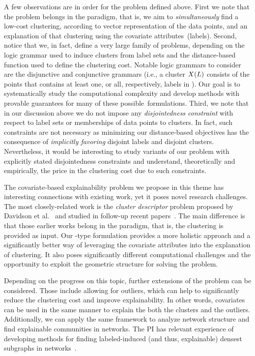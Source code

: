\documentclass[a4paper,11pt]{article}
\begin{document}
A few observations are in order for the problem defined above.
First we note that the problem belongs in the \joint paradigm, 
that is, we aim to \emph{simultaneously} find a low-cost clustering, 
according to vector representation of the data points,
and an explanation of that clustering using the covariate attributes~(labels).
%
Second, notice that we, in fact, define a very large family of problems, 
depending on the logic grammar used to induce clusters from label sets
and the distance-based function used to define the clustering cost.
Notable logic grammars to consider are the disjunctive and conjunctive grammars 
(i.e., a cluster $X({L})$ consists of the points 
that contains at least one, or all, respectively, labels in ).
Our goal is to systematically study the computational complexity and 
develop methods with provable guarantees
for many of these possible~formulations.
%
Third, we note that in our discussion above we do not impose any
\emph{disjointedness constraint} with respect to label sets or 
memberships of data points to clusters. 
In fact, such constraints are not necessary as minimizing 
our distance-based objectives has the consequence of \emph{implicitly favoring}
disjoint labels and disjoint clusters.
Nevertheless, it would be interesting to study variants
of our problem with explicitly stated disjointedness constraints
and understand, theoretically and empirically, 
the price in the clustering cost due to such constraints.

The covariate-based explainability problem we propose in this theme
has interesting connections with existing work, yet it poses novel research challenges.
The most closely-related work is the \emph{cluster descriptor} problem
proposed by Davidson et al.~\cite{davidson2018cluster} 
and studied in follow-up recent papers~\citep{sambaturu2020efficient}.
The main difference is that those earlier works belong in the \posthoc paradigm, 
that is, the clustering is provided as input. 
Our \joint-type formulation provides a more holistic approach and a
significantly better way of leveraging the covariate attributes into the explanation of clustering. 
It also poses significantly different computational challenges
and the opportunity to exploit the geometric structure for solving the problem.

Depending on the progress on this topic, further extensions of the problem can be considered. 
Those include allowing for outliers, which can help to significantly reduce the clustering cost
and improve explainability.
In other words, covariates can be used in the same manner
to explain the both the clusters and the outliers.
Additionally, we can apply the same framework to analyze network structure and find
explainable communities in networks.
The PI has relevant experience of developing methods for finding labeled-induced
(and thus, explainable) densest subgraphs in networks~\cite{galbrun2014overlapping}.
\end{document}
